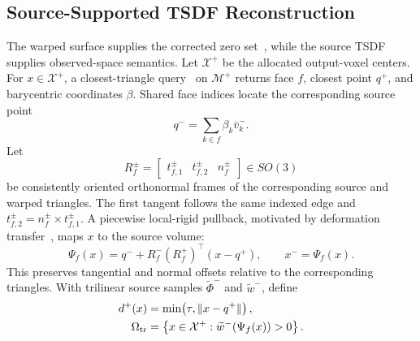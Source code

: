 \subsection{Source-Supported TSDF Reconstruction}

The warped surface supplies the corrected zero set~\cite{sussman1999redistancing},
while the source TSDF supplies observed-space semantics. Let $\mathcal X^+$ be
the allocated output-voxel centers. For $x\in\mathcal X^+$, a closest-triangle
query~\cite{10.1145/2601097.2601199} on
$\mathcal M^+$ returns face $f$, closest point $q^+$, and barycentric
coordinates $\beta$. Shared face indices locate the corresponding source point
\begin{equation}
q^-=\sum_{k\in f}\beta_k\bar v_k^-.
\label{eq:source_correspondence}
\end{equation}
Let
\begin{equation}
R_f^\pm=
\begin{bmatrix}
t_{f,1}^\pm & t_{f,2}^\pm & n_f^\pm
\end{bmatrix}\in SO(3)
\label{eq:triangle_frames}
\end{equation}
be consistently oriented orthonormal frames of the corresponding source and
warped triangles. The first tangent follows the same indexed edge and
$t_{f,2}^\pm=n_f^\pm\times t_{f,1}^\pm$. A piecewise local-rigid pullback,
motivated by deformation transfer~\cite{sumner2004deformationtransfer}, maps
$x$ to the source volume:
\begin{equation}
\Psi_f(x)=q^-+R_f^-(R_f^+)^\top(x-q^+),
\qquad x^-=\Psi_f(x).
\label{eq:inverse_map}
\end{equation}
This preserves tangential and normal offsets relative to the corresponding
triangles. With trilinear source samples $\widetilde\Phi^-$ and
$\widetilde w^-$, define
\begin{equation}
\begin{aligned}
d^+(x)&=\min\!\left(\tau,\|x-q^+\|\right),\\
\Omega_{\rm tr}&=
\left\{x\in\mathcal X^+:\widetilde w^-(\Psi_f(x))>0\right\}.
\end{aligned}
\label{eq:transferred_support}
\end{equation}

